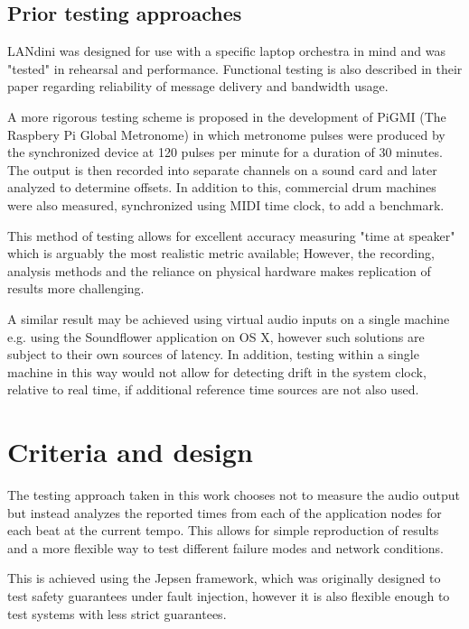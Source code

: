 \documentclass[11pt]{article} %
\theoremstyle{plain}
\theoremstyle{definition}
\begin{document}
\subsection{Prior testing approaches}

LANdini\cite{narveson2013landini} was designed for use with a specific laptop
orchestra in mind and was "tested" in rehearsal and performance. Functional
testing is also described in their paper regarding reliability of message
delivery and bandwidth usage.

A more rigorous testing scheme is proposed in the development of
PiGMI\cite{Oda2016} (The Raspbery Pi Global Metronome) in which metronome
pulses were produced by the synchronized device at 120 pulses per minute for a
duration of 30 minutes. The output is then recorded into separate channels on a
sound card and later analyzed to determine offsets. In addition to this,
commercial drum machines were also measured, synchronized using MIDI time
clock, to add a benchmark.

This method of testing allows for excellent accuracy measuring "time at
speaker" which is arguably the most realistic metric available; However, the
recording, analysis methods and the reliance on physical hardware makes
replication of results more challenging.

A similar result may be achieved using virtual audio inputs on a single machine
e.g. using the Soundflower application on OS X, however such solutions are
subject to their own sources of latency. In addition, testing within a single
machine in this way would not allow for detecting drift in the system clock,
relative to real time, if additional reference time sources are not also used.

\section{Criteria and design}

The testing approach taken in this work chooses not to measure the audio output
but instead analyzes the reported times from each of the application nodes for
each beat at the current tempo.  This allows for simple reproduction of results
and a more flexible way to test different failure modes and network conditions.

This is achieved using the Jepsen framework\cite{jepsen}, which was
originally designed to test safety guarantees under fault injection, however it
is also flexible enough to test systems with less strict guarantees.
\end{document}

